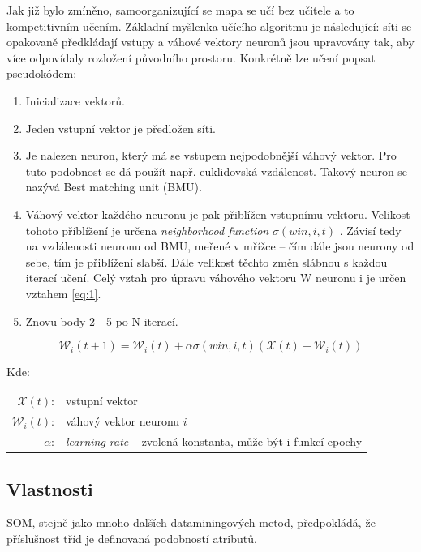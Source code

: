 \documentclass[thesis=M,czech]{FITthesis}[2012/06/26]
\begin{document}
Jak již bylo zmíněno, samoorganizující se mapa se učí bez učitele a to kompetitivním učením. Základní myšlenka učícího algoritmu je následující: síti se opakovaně předkládají vstupy a váhové vektory neuronů jsou upravovány tak, aby více odpovídaly rozložení původního prostoru.
Konkrétně lze učení popsat pseudokódem:

\begin{enumerate}
\item Inicializace vektorů.
\item Jeden vstupní vektor je předložen síti.
\item Je nalezen neuron, který má se vstupem nejpodobnější váhový vektor. Pro tuto podobnost se dá použít např. euklidovská vzdálenost. Takový neuron se nazývá Best matching unit (BMU).
\item Váhový vektor každého neuronu je pak přiblížen vstupnímu vektoru. Velikost tohoto příblížení je určena \textit{neighborhood function} $\sigma(win, i, t)$ .
Závisí tedy na vzdálenosti neuronu od BMU, meřené v mřížce -- čím dále jsou neurony od sebe, tím je přiblížení slabší. Dále velikost těchto změn slábnou s každou iterací učení. Celý vztah pro úpravu váhového vektoru W neuronu i je určen vztahem \ref{eq:1}.


\item Znovu body 2 - 5 po N iterací.
\end{enumerate}

\begin{equation} \label{eq:1}
    \mathcal{W}_i(t+1) = \mathcal{W}_i(t) + \alpha \sigma(win, i, t)(\mathcal{X}(t) - \mathcal{W}_i(t))    
\end{equation}

Kde:\\
\hspace*{3em}
\begin{tabular}{rl}
    $\mathcal{X}(t)$:& vstupní vektor \\
    $\mathcal{W}_i(t)$:& váhový vektor neuronu $i$ \\
    $\alpha$:& \textit{learning rate} -- zvolená konstanta, může být i funkcí epochy \\
\end{tabular}


\subsection{Vlastnosti}
SOM, stejně jako mnoho dalších dataminingových metod, předpokládá, že příslušnost tříd je definovaná podobností atributů.
\end{document}
